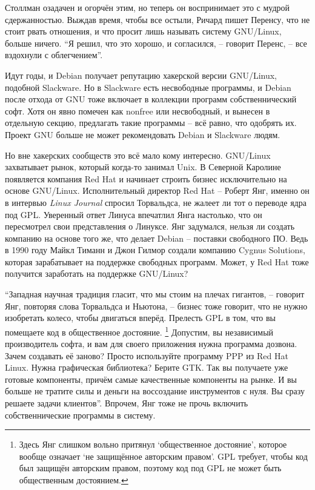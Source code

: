 Столлман озадачен и огорчён этим, но теперь он воспринимает это с мудрой сдержанностью. Выждав время, чтобы все остыли, Ричард пишет Перенсу, что не стоит рвать отношения, и что просит лишь называть систему GNU/Linux, больше ничего. \enquote{Я решил, что это хорошо, и согласился, -- говорит Перенс, -- все вздохнули с облегчением}.

Идут годы, и Debian получает репутацию хакерской версии GNU/Linux, подобной Slackware. Но в Slackware есть несвободные программы, и Debian после отхода от GNU тоже включает в коллекции программ собственнический софт. Хотя он явно помечен как nonfree или несвободный, и вынесен в отдельную секцию, предлагать такие программы -- всё равно, что одобрять их. Проект GNU больше не может рекомендовать Debian и Slackware людям.

Но вне хакерских сообществ это всё мало кому интересно. GNU/Linux захватывает рынок, который когда-то занимал Unix. В Северной Каролине появляется компания Red Hat и начинает строить бизнес исключительно на основе GNU/Linux. Исполнительный директор Red Hat -- Роберт Янг, именно он в интервью \textit{Linux Journal} спросил Торвальдса, не жалеет ли тот о переводе ядра под GPL. Уверенный ответ Линуса впечатлил Янга настолько, что он пересмотрел свои представления о Линуксе. Янг задумался, нельзя ли создать компанию на основе того же, что делает Debian -- поставки свободного ПО. Ведь в 1990 году Майкл Тиманн и Джон Гилмор создали компанию Cygnus Solutions, которая зарабатывает на поддержке свободных программ. Может, у Red Hat тоже получится заработать на поддержке GNU/Linux?

\enquote{Западная научная традиция гласит, что мы стоим на плечах гигантов, -- говорит Янг, повторяя слова Торвальдса и Ньютона, -- бизнес тоже говорит, что не нужно изобретать колесо, чтобы двигаться вперёд. Прелесть GPL в том, что вы помещаете код в общественное достояние. \footnote{Здесь Янг слишком вольно притянул \enquote{общественное достояние}, которое вообще означает \enquote{не защищённое авторским правом}. GPL требует, чтобы код был защищён авторским правом, поэтому код под GPL не может быть общественным достоянием.} Допустим, вы независимый производитель софта, и вам для своего приложения нужна программа дозвона. Зачем создавать её заново? Просто используйте программу PPP из Red Hat Linux. Нужна графическая библиотека? Берите GTK. Так вы получаете уже готовые компоненты, причём самые качественные компоненты на рынке. И вы больше не тратите силы и деньги на воссоздание инструментов с нуля. Вы сразу решаете задачи клиентов}. Впрочем, Янг тоже не прочь включить собственнические программы в систему.

